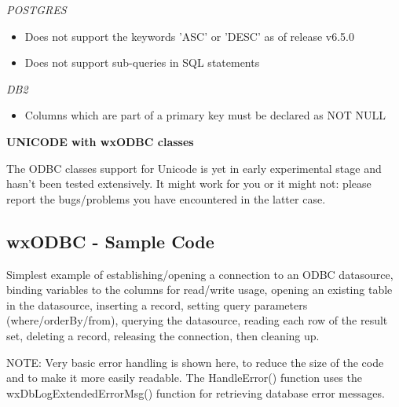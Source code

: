 {\it POSTGRES}
\begin{itemize}\itemsep=0pt
\item Does not support the keywords 'ASC' or 'DESC' as of release v6.5.0
\item Does not support sub-queries in SQL statements
\end{itemize}

{\it DB2}
\begin{itemize}\itemsep=0pt
\item Columns which are part of a primary key must be declared as NOT NULL
\end{itemize}

{\bf UNICODE with wxODBC classes}

The ODBC classes support for Unicode is yet in early experimental stage and
hasn't been tested extensively. It might work for you or it might not: please
report the bugs/problems you have encountered in the latter case.

\subsection{wxODBC - Sample Code}\label{wxodbcsamplecode1}

Simplest example of establishing/opening a connection to an ODBC datasource, 
binding variables to the columns for read/write usage, opening an 
existing table in the datasource, inserting a record, setting query parameters 
(where/orderBy/from), querying the datasource, reading each row of the 
result set, deleting a record, releasing the connection, then cleaning up.

NOTE: Very basic error handling is shown here, to reduce the size of the 
code and to make it more easily readable.  The HandleError() function uses the wxDbLogExtendedErrorMsg() function for retrieving database error messages.

